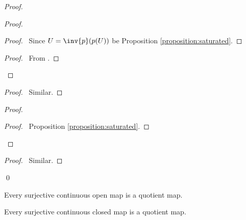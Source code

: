 \begin{proof}
    \pf
    \begin{proof}
        \begin{proof}
            \pf\ Since $U = \inv{p}(p(U))$ be Proposition \ref{proposition:saturated}.
        \end{proof}
        \begin{proof}
            \pf\ From .
        \end{proof}
    \end{proof}
    \begin{proof}
        \pf\ Similar.
    \end{proof}
    \begin{proof}
        \begin{proof}
            \pf\ Proposition \ref{proposition:saturated}.
        \end{proof}
    \end{proof}
    \begin{proof}
        \pf\ Similar.
    \end{proof}
    \qed
\end{proof}

\begin{corollary}
    \label{corollary:quotient_continuous_open}
    Every surjective continuous open map is a quotient map.
\end{corollary}

\begin{corollary}
    \label{corollary:closed_map_quotient}
    Every surjective continuous closed map is a quotient map.
\end{corollary}

